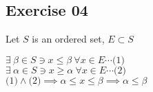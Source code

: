 \subsection*{Exercise 04}
Let $S$ is an ordered set, $E \subset S$ 
\begin{flushleft}
$\exists\ \beta \in S \ni x \leq \beta \ \forall x \in E \cdots \text{(1)}$   \\
$\exists\ \alpha \in S \ni x \geq \alpha \ \forall x \in E \cdots \text{(2)}$ \\
$\text{(1)} \land \text{(2)} \implies \alpha \leq x \leq \beta \implies \alpha \leq \beta$
\end{flushleft}
